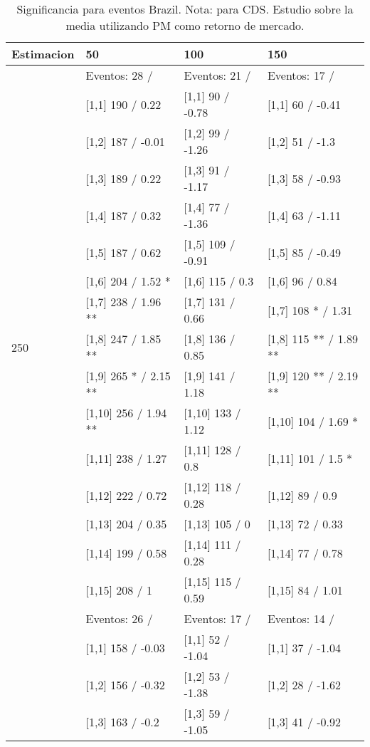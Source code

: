 \begin{table}

\caption{Significancia para eventos Brazil. Nota: para CDS. Estudio sobre la media utilizando PM como retorno de mercado.}
\centering
\begin{tabular}[t]{llll}
\toprule
Estimacion & 50 & 100 & 150\\
\midrule
 & Eventos:  28 / & Eventos:  21 / & Eventos:  17 /\\
 & {}[1,1] 190  / 0.22 & {}[1,1] 90  / -0.78 & {}[1,1] 60  / -0.41\\
 & {}[1,2] 187  / -0.01 & {}[1,2] 99  / -1.26 & {}[1,2] 51  / -1.3\\
 & {}[1,3] 189  / 0.22 & {}[1,3] 91  / -1.17 & {}[1,3] 58  / -0.93\\
 & {}[1,4] 187  / 0.32 & {}[1,4] 77  / -1.36 & {}[1,4] 63  / -1.11\\
\addlinespace
 & {}[1,5] 187  / 0.62 & {}[1,5] 109  / -0.91 & {}[1,5] 85  / -0.49\\
 & {}[1,6] 204  / 1.52 * & {}[1,6] 115  / 0.3 & {}[1,6] 96  / 0.84\\
 & {}[1,7] 238  / 1.96 ** & {}[1,7] 131  / 0.66 & {}[1,7] 108 * / 1.31\\
250 & {}[1,8] 247  / 1.85 ** & {}[1,8] 136  / 0.85 & {}[1,8] 115 ** / 1.89 **\\
 & {}[1,9] 265 * / 2.15 ** & {}[1,9] 141  / 1.18 & {}[1,9] 120 ** / 2.19 **\\
\addlinespace
 & {}[1,10] 256  / 1.94 ** & {}[1,10] 133  / 1.12 & {}[1,10] 104  / 1.69 *\\
 & {}[1,11] 238  / 1.27 & {}[1,11] 128  / 0.8 & {}[1,11] 101  / 1.5 *\\
 & {}[1,12] 222  / 0.72 & {}[1,12] 118  / 0.28 & {}[1,12] 89  / 0.9\\
 & {}[1,13] 204  / 0.35 & {}[1,13] 105  / 0 & {}[1,13] 72  / 0.33\\
 & {}[1,14] 199  / 0.58 & {}[1,14] 111  / 0.28 & {}[1,14] 77  / 0.78\\
\addlinespace
 & {}[1,15] 208  / 1 & {}[1,15] 115  / 0.59 & {}[1,15] 84  / 1.01\\
 & Eventos:  26 / & Eventos:  17 / & Eventos:  14 /\\
 & {}[1,1] 158  / -0.03 & {}[1,1] 52  / -1.04 & {}[1,1] 37  / -1.04\\
 & {}[1,2] 156  / -0.32 & {}[1,2] 53  / -1.38 & {}[1,2] 28  / -1.62\\
 & {}[1,3] 163  / -0.2 & {}[1,3] 59  / -1.05 & {}[1,3] 41  / -0.92\\

\end{tabular}
\end{table}
